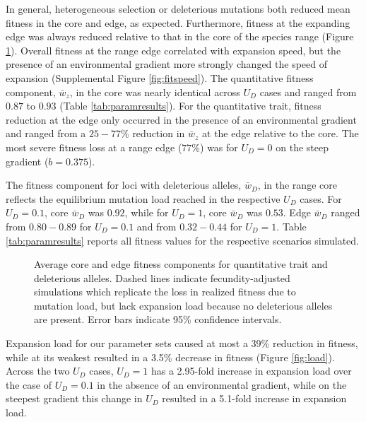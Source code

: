 In general, heterogeneous selection or deleterious mutations both reduced mean fitness in the core and edge, as expected. Furthermore, fitness at the expanding edge was always reduced relative to that in the core of the species range (Figure \ref{fig:fitness}). Overall fitness at the range edge correlated with expansion speed, but the presence of an environmental gradient more strongly changed the speed of expansion (Supplemental Figure \ref{fig:fitspeed}). The quantitative fitness component, $\bar{w}_z$, in the core was nearly identical across $U_D$ cases and ranged from $0.87$ to $0.93$ (Table \ref{tab:paramresults}). For the quantitative trait, fitness reduction at the edge only occurred in the presence of an environmental gradient and ranged from a $25-77\%$ reduction in $\bar{w}_z$ at the edge relative to the core. The most severe fitness loss at a range edge ($77\%$) was for $U_D = 0$ on the steep gradient ($b = 0.375$).

The fitness component for loci with deleterious alleles, $\bar{w}_D$, in the range core reflects the equilibrium mutation load reached in the respective $U_D$ cases. For  $U_D = 0.1$, core $\bar{w}_D$ was $0.92$, while for $U_D = 1$, core $\bar{w}_D$ was $0.53$. Edge $\bar{w}_D$ ranged from $0.80-0.89$ for $U_D = 0.1$ and from $0.32-0.44$ for $U_D = 1$. Table \ref{tab:paramresults} reports all fitness values for the respective scenarios simulated.


\begin{figure}[h]
\centering
{}
\caption[~- Average core and edge fitness.]{Average core and edge fitness components for quantitative trait and deleterious alleles. Dashed lines indicate fecundity-adjusted simulations which replicate the loss in realized fitness due to mutation load, but lack expansion load because no deleterious alleles are present. Error bars indicate 95\% confidence intervals.}
\label{fig:fitness}
\end{figure}


Expansion load for our parameter sets caused at most a 39\% reduction in fitness, while at its weakest resulted in a 3.5\% decrease in fitness (Figure \ref{fig:load}). %
Across the two $U_D$ cases, $U_D = 1$ has a 2.95-fold increase in expansion load over the case of $U_D = 0.1$ in the absence of an environmental gradient, while on the steepest gradient this change in $U_D$ resulted in a 5.1-fold increase in expansion load.

